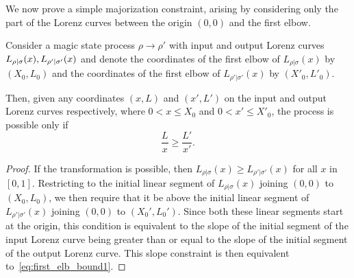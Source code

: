 \documentclass[pra,
aps,
twocolumn,
superscriptaddress,
groupedaddress,
nofootinbib,
reprint
]{revtex4-1}
\begin{document}
We now prove a simple majorization constraint, arising by considering only the part of the Lorenz curves between the origin $(0,0)$ and the first elbow.
\begin{proposition}\label{prop:first_elb}
	Consider a magic state process $\rho \longrightarrow \rho'$ with input and output Lorenz curves ${L_{\rho|\sigma}}(x), {L_{\rho'|\sigma'}}(x)$ and denote the coordinates of the first elbow of $L_{\rho|\sigma}(x)$ by $(X_0, L_0)$ and the coordinates of the first elbow of $L_{\rho' |\sigma'}(x)$ by $(X'_0, L'_0)$.
	
Then, given any coordinates $(x, L)$ and $(x', L')$ on the input and output Lorenz curves respectively, where $0 < x \leq X_0$ and $0 < x' \leq X'_0$, the process is possible only if
\begin{equation}\label{eq:first_elb_bound1}
	\frac{L}{x} \geq \frac{L'}{x'}.
\end{equation}
\end{proposition}
\begin{proof} 
	If the transformation is possible, then $L_{\rho|\sigma}(x) \geq L_{\rho'|\sigma'} (x)$ for all $x$ in $[0,1]$. 
	Restricting to the initial linear segment of $L_{\rho|\sigma}(x)$ joining $(0,0)$ to $(X_0,L_0)$, we then require that it be above the initial linear segment of $L_{\rho'|\sigma'}(x)$ joining $(0,0)$ to $(X_0', L_0')$. 
	Since both these linear segments start at the origin, this condition is equivalent to the slope of the initial segment of the input Lorenz curve being greater than or equal to the slope of the initial segment of the output Lorenz curve. 
	This slope constraint is then equivalent to~\cref{eq:first_elb_bound1}. \end{proof}
\end{document}
